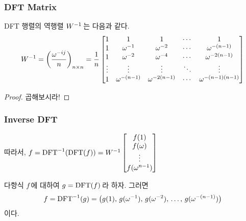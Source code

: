 \begin{frame}
    \frametitle{DFT Matrix}
    \begin{theorem}
        DFT 행렬의 역행렬 \(W^{-1}\)\,는 다음과 같다.
        \[
            W^{-1} = \left(\frac{\omega^{-ij}}{n}\right)_{n\times n} = \frac{1}{n}\begin{bmatrix}
                1      & 1                 & 1                  & \cdots & 1                        \\
                1      & \omega^{-1}       & \omega^{-2}        & \cdots & \omega^{-(n - 1)}        \\
                1      & \omega^{-2}       & \omega^{-4}        & \cdots & \omega^{-2(n - 1)}       \\
                \vdots & \vdots            & \vdots             & \ddots & \vdots                   \\
                1      & \omega^{-(n - 1)} & \omega^{-2(n - 1)} & \cdots & \omega^{-(n - 1)(n - 1)}
            \end{bmatrix}
        \]
    \end{theorem}

    \pause

    \begin{proof}
        곱해보시라!
    \end{proof}
\end{frame}

\begin{frame}
    \frametitle{Inverse DFT}

    따라서, \(f = \mathrm{DFT}^{-1}(\mathrm{DFT}(f)) = W^{-1} \begin{bmatrix} f(1) \\ f(\omega) \\ \vdots \\ f(\omega^{n - 1}) \end{bmatrix}\)

    \pause
    \begin{theorem}
        다항식 \(f\)\,에 대하여 \(g = \mathrm{DFT}(f)\)\,라 하자. 그러면
        \[
            f = \mathrm{DFT}^{-1}(g) = \big(g(1),\, g(\omega^{-1}),\, g(\omega^{-2}),\, \dots,\, g(\omega^{-(n-1)})\big)
        \]
        이다.
    \end{theorem}
\end{frame}


